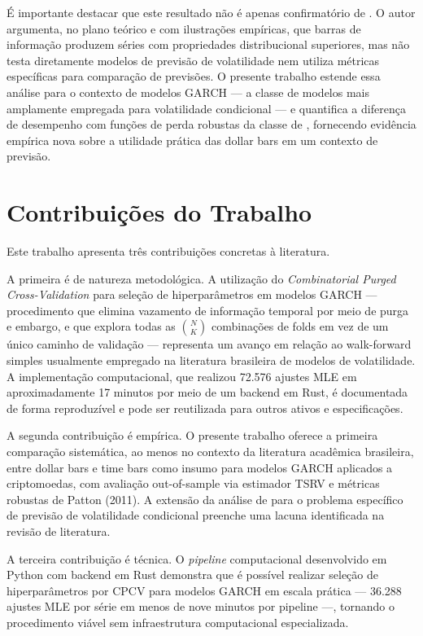 É importante destacar que este resultado não é apenas confirmatório de \citet{Prado2018}.
O autor argumenta, no plano teórico e com ilustrações empíricas, que barras de informação
produzem séries com propriedades distribucional superiores, mas não testa diretamente
modelos de previsão de volatilidade nem utiliza métricas específicas para comparação de
previsões. O presente trabalho estende essa análise para o contexto de modelos GARCH —
a classe de modelos mais amplamente empregada para volatilidade condicional — e quantifica
a diferença de desempenho com funções de perda robustas da classe de \citet{Patton2011},
fornecendo evidência empírica nova sobre a utilidade prática das dollar bars em um contexto
de previsão.

\section{Contribuições do Trabalho}
\label{sec:contribuicoes}

Este trabalho apresenta três contribuições concretas à literatura.

A primeira é de natureza metodológica. A utilização do \textit{Combinatorial Purged
Cross-Validation} para seleção de hiperparâmetros em modelos GARCH — procedimento que
elimina vazamento de informação temporal por meio de purga e embargo, e que explora
todas as $\binom{N}{K}$ combinações de folds em vez de um único caminho de validação —
representa um avanço em relação ao walk-forward simples usualmente empregado na literatura
brasileira de modelos de volatilidade. A implementação computacional, que realizou 72.576
ajustes MLE em aproximadamente 17 minutos por meio de um backend em Rust, é documentada
de forma reproduzível e pode ser reutilizada para outros ativos e especificações.

A segunda contribuição é empírica. O presente trabalho oferece a primeira comparação
sistemática, ao menos no contexto da literatura acadêmica brasileira, entre dollar bars
e time bars como insumo para modelos GARCH aplicados a criptomoedas, com avaliação
out-of-sample via estimador TSRV e métricas robustas de Patton (2011). A extensão da
análise de \citet{Prado2018} para o problema específico de previsão de volatilidade
condicional preenche uma lacuna identificada na revisão de literatura.

A terceira contribuição é técnica. O \textit{pipeline} computacional desenvolvido em
Python com backend em Rust demonstra que é possível realizar seleção de hiperparâmetros
por CPCV para modelos GARCH em escala prática — 36.288 ajustes MLE por série em menos
de nove minutos por pipeline —, tornando o procedimento viável sem infraestrutura
computacional especializada.

